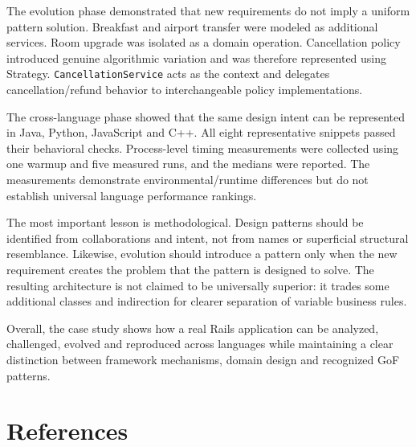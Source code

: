 \documentclass[10pt,a4paper]{article}
\newcommand{\code}[1]{\texttt{\small #1}}
\begin{document}
The evolution phase demonstrated that new requirements do not imply a uniform pattern solution. Breakfast and airport transfer were modeled as additional services. Room upgrade was isolated as a domain operation. Cancellation policy introduced genuine algorithmic variation and was therefore represented using Strategy. \code{CancellationService} acts as the context and delegates cancellation/refund behavior to interchangeable policy implementations.

The cross-language phase showed that the same design intent can be represented in Java, Python, JavaScript and C++. All eight representative snippets passed their behavioral checks. Process-level timing measurements were collected using one warmup and five measured runs, and the medians were reported. The measurements demonstrate environmental/runtime differences but do not establish universal language performance rankings.

The most important lesson is methodological. Design patterns should be identified from collaborations and intent, not from names or superficial structural resemblance. Likewise, evolution should introduce a pattern only when the new requirement creates the problem that the pattern is designed to solve. The resulting architecture is not claimed to be universally superior: it trades some additional classes and indirection for clearer separation of variable business rules.

Overall, the case study shows how a real Rails application can be analyzed, challenged, evolved and reproduced across languages while maintaining a clear distinction between framework mechanisms, domain design and recognized GoF patterns.

\section{References}
\end{document}
